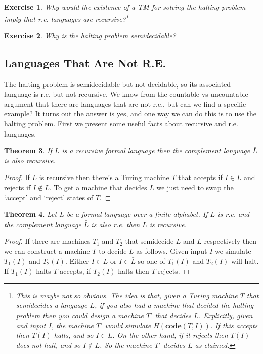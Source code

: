 \documentclass{article}
\theoremstyle{plain}
\newtheorem{theorem}{Theorem}[section]{\bfseries}{\itshape}
\newtheorem{exercise}[theorem]{Exercise}{\bfseries}{\upshape}
\theoremstyle{definition}
\newcommand{\co}{\mathbf{code}}
\begin{document}
\begin{exercise}\label{E:H}
Why would the existence of a TM for solving the halting problem imply that r.e. languages are recursive?\footnote{This is maybe not so obvious. The idea is that, given a Turing machine $T$ that semidecides a language $L$, if you also had a machine that decided the halting problem then you could design a machine $T'$ that decides $L$. Explicitly, given and input $I$, the machine $T'$ would simulate $H(\co(T,I))$. If this accepts then $T(I)$ halts, and so $I\in L$. On the other hand, if it rejects then $T(I)$ does not halt, and so $I\notin L$. So the machine $T'$ decides $L$ as claimed. }
\end{exercise}  

\begin{exercise}
Why is the halting problem semidecidable?
\end{exercise}



\subsection{Languages That Are Not R.E.}
The halting problem is semidecidable but not decidable, so its associated language is r.e. but not recursive. We know from the countable vs uncountable argument that there are languages that are not r.e., but can we find a specific example? It turns out the answer is yes, and one way we can do this is to use the halting problem. First we present some useful facts about recursive and r.e. languages.

\begin{theorem}\label{T:rec}
If $L$ is a recursive formal language then the complement language $\bar{L}$ is also recursive.
\end{theorem}
\begin{proof}
If $L$ is recursive then there's a Turing machine $T$ that accepts if $I\in L$ and rejects if $I\notin L$. To get a machine that decides $\bar{L}$ we just need to swap the `accept' and `reject' states of $T$.
\end{proof}

\begin{theorem}\label{T:comps}
Let $L$ be a formal language over a finite alphabet. If $L$ is r.e. and the complement language $\bar{L}$ is also r.e. then $L$ is recursive.
\end{theorem}
\begin{proof}
If there are machines $T_1$ and $T_2$ that semidecide $L$ and $\bar{L}$ respectively then we can construct a machine $T$ to decide $L$ as follows. Given input $I$ we simulate $T_1(I)$ and $T_2(I)$. Either $I\in L$ or $I\in \bar{L}$ so one of $T_1(I)$ and $T_2(I)$ will halt. If $T_1(I)$ halts $T$ accepts, if $T_2(I)$ halts then $T$ rejects.  
\end{proof}
\end{document}
